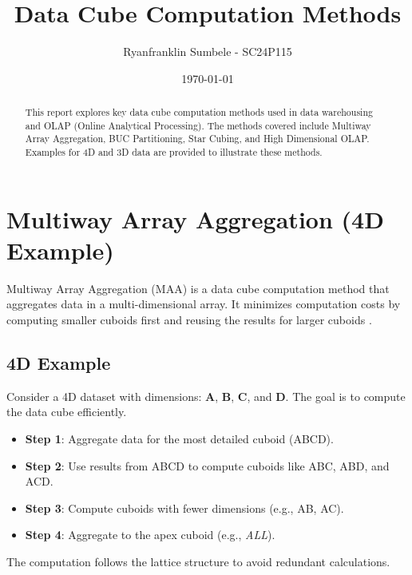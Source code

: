 \documentclass[12pt,a4paper]{article}
\title{Data Cube Computation Methods}
\author{Ryanfranklin Sumbele - SC24P115}
\date{\today}
\begin{document}
\maketitle
\thispagestyle{empty}

\begin{abstract}
This report explores key data cube computation methods used in data warehousing and OLAP (Online Analytical Processing). The methods covered include Multiway Array Aggregation, BUC Partitioning, Star Cubing, and High Dimensional OLAP. Examples for 4D and 3D data are provided to illustrate these methods.
\end{abstract}

\tableofcontents
\newpage

\section{Multiway Array Aggregation (4D Example)}
Multiway Array Aggregation (MAA) is a data cube computation method that aggregates data in a multi-dimensional array. It minimizes computation costs by computing smaller cuboids first and reusing the results for larger cuboids \cite{agarwal1996aggregate}.

\subsection*{4D Example}
Consider a 4D dataset with dimensions: \textbf{A}, \textbf{B}, \textbf{C}, and \textbf{D}. The goal is to compute the data cube efficiently.

\begin{itemize}
    \item \textbf{Step 1}: Aggregate data for the most detailed cuboid (ABCD).
    \item \textbf{Step 2}: Use results from ABCD to compute cuboids like ABC, ABD, and ACD.
    \item \textbf{Step 3}: Compute cuboids with fewer dimensions (e.g., AB, AC).
    \item \textbf{Step 4}: Aggregate to the apex cuboid (e.g., \textit{ALL}).
\end{itemize}

The computation follows the lattice structure to avoid redundant calculations.

\end{document}
